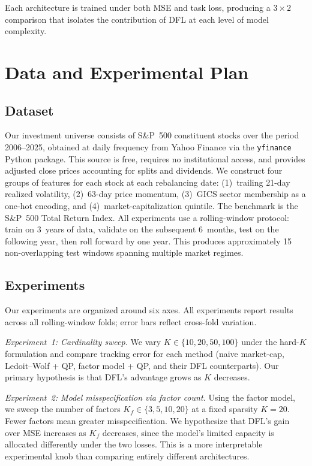 \documentclass[11pt]{article}
\begin{document}
Each architecture is trained under both MSE and task loss, producing a $3 \times 2$ comparison that isolates the contribution of DFL at each level of model complexity.

\section{Data and Experimental Plan}

\subsection{Dataset}

Our investment universe consists of S\&P~500 constituent stocks over the period 2006--2025, obtained at daily frequency from Yahoo Finance via the \texttt{yfinance} Python package. This source is free, requires no institutional access, and provides adjusted close prices accounting for splits and dividends. We construct four groups of features for each stock at each rebalancing date: (1)~trailing 21-day realized volatility, (2)~63-day price momentum, (3)~GICS sector membership as a one-hot encoding, and (4)~market-capitalization quintile. The benchmark is the S\&P~500 Total Return Index. All experiments use a rolling-window protocol: train on 3~years of data, validate on the subsequent 6~months, test on the following year, then roll forward by one year. This produces approximately 15 non-overlapping test windows spanning multiple market regimes.

\subsection{Experiments}

Our experiments are organized around six axes. All experiments report results across all rolling-window folds; error bars reflect cross-fold variation.

\textit{Experiment~1: Cardinality sweep.}
We vary $K \in \{10, 20, 50, 100\}$ under the hard-$K$ formulation and compare tracking error for each method (naive market-cap, Ledoit--Wolf + QP, factor model + QP, and their DFL counterparts). Our primary hypothesis is that DFL's advantage grows as $K$ decreases.

\textit{Experiment~2: Model misspecification via factor count.}
Using the factor model, we sweep the number of factors $K_f \in \{3, 5, 10, 20\}$ at a fixed sparsity $K=20$. Fewer factors mean greater misspecification. We hypothesize that DFL's gain over MSE increases as $K_f$ decreases, since the model's limited capacity is allocated differently under the two losses. This is a more interpretable experimental knob than comparing entirely different architectures.
\end{document}
